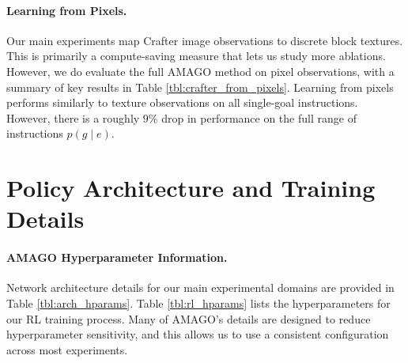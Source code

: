 \paragraph{Learning from Pixels.} Our main experiments map Crafter image observations to discrete block textures. This is primarily a compute-saving measure that lets us study more ablations. However, we do evaluate the full AMAGO method on pixel observations, with a summary of key results in Table \ref{tbl:crafter_from_pixels}. Learning from pixels performs similarly to texture observations on all single-goal instructions. However, there is a roughly $9\%$ drop in performance on the full range of instructions $p(g \mid e)$.

 
\section{Policy Architecture and Training Details}
\label{app:hparams}

\paragraph{AMAGO Hyperparameter Information.} Network architecture details for our main experimental domains are provided in Table \ref{tbl:arch_hparams}. Table \ref{tbl:rl_hparams} lists the hyperparameters for our RL training process. Many of AMAGO's details are designed to reduce hyperparameter sensitivity, and this allows us to use a consistent configuration across most experiments. 

